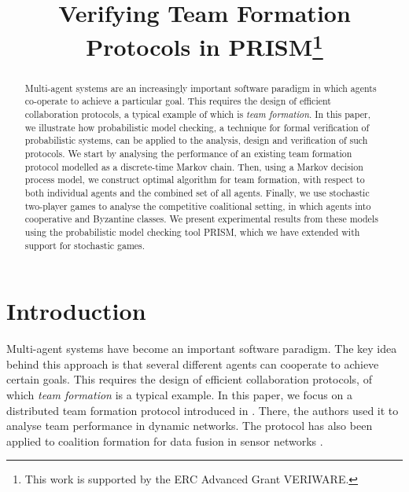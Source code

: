 \documentclass{llncs}
\newcommand{\comment}[1]{\marginpar{\footnotesize \color{red} \textsf{#1}}}
\begin{document}
\title{Verifying Team Formation Protocols in PRISM\thanks{This work is supported by
the ERC Advanced Grant VERIWARE.}}
\author{}
\email{}

\maketitle

\begin{abstract}
Multi-agent systems are an increasingly important software paradigm
in which agents co-operate to achieve a particular goal.
This requires the design of efficient collaboration protocols,
a typical example of which is \emph{team formation}.
In this paper, we illustrate how probabilistic model checking,
a technique for formal verification of probabilistic systems,
can be applied to the analysis, design and verification of such protocols.
We start by analysing the performance of an existing team formation protocol
modelled as a discrete-time Markov chain.
Then, using a Markov decision process model,
we construct optimal algorithm for team formation,
with respect to both individual agents and the combined set of all agents.
Finally, we use stochastic two-player games to analyse the competitive coalitional setting,
in which agents into cooperative and Byzantine classes.
We present experimental results from these models
using the probabilistic model checking tool PRISM,
which we have extended with support for stochastic games.
\end{abstract}

\section{Introduction}

\comment{Add some comments about complexity}
%
Multi-agent systems have become an important software paradigm.
The key idea behind this approach is that several different agents can cooperate to achieve certain goals.
This requires the design of efficient collaboration protocols, of which \emph{team formation} is a typical example. In this paper, we focus on a distributed team formation protocol introduced in \cite{gaston2005agent}. There, the authors used it to analyse team performance in dynamic networks.
The protocol %
has also been applied to coalition formation for data fusion in sensor networks \cite{glinton2008agent}.
\end{document}
